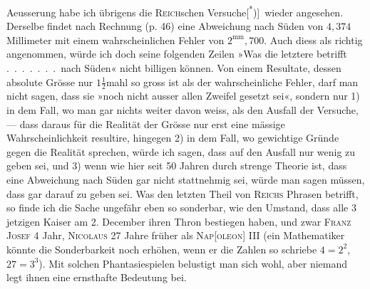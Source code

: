 \clearpage{}
\noindent Aeusserung habe ich übrigens die \textsc{Reich}schen Versuche[\textsuperscript{*})]\begingroup\renewcommand{\thefootnote}{}\endgroup\ wieder angesehen.
Derselbe findet nach  Rechnung (p. 46) eine Abweichung nach Süden
von \(4{,}374\) Millimeter mit einem wahrscheinlichen Fehler von \(2^{\mathrm{mm}}{,}700\). Auch
diess als richtig angenommen, würde ich doch seine folgenden Zeilen »Was
die letztere betrifft .\ .\ .\ .\ .\ .\ .\ nach Süden« nicht billigen können. Von einem
Resultate, dessen absolute Grösse nur \(1\tfrac{1}{2}\)mahl so gross ist als der wahrscheinliche
Fehler, darf man nicht sagen, dass sie »noch nicht ausser allen Zweifel
gesetzt sei«, sondern nur 1) in dem Fall, wo man gar nichts weiter davon
weiss, als den Ausfall der Versuche, — dass daraus für die Realität der Grösse
nur erst eine mässige Wahrscheinlichkeit resultire, hingegen 2) in dem Fall,
wo  gewichtige Gründe gegen die Realität sprechen, würde ich sagen,
dass auf den Ausfall nur wenig zu geben sei, und 3) wenn wie hier seit 50
Jahren durch strenge Theorie  ist, dass eine Abweichung nach Süden
gar nicht stattnehmig sei, würde man sagen müssen, dass gar  darauf
zu geben sei. Was den letzten Theil von \textsc{Reichs} Phrasen betrifft, so finde
ich die Sache ungefähr eben so sonderbar, wie den Umstand, dass alle 3 jetzigen
Kaiser am 2. December ihren Thron bestiegen haben, und zwar \textsc{Franz Josef}
4 Jahr, \textsc{Nicolaus} 27 Jahre früher als \textsc{Nap[oleon]} III (ein Mathematiker könnte
die Sonderbarkeit noch erhöhen, wenn er die Zahlen so schriebe \(4=2^2\),
\(27=3^3\)). Mit solchen Phantasiespielen belustigt man sich wohl, aber niemand
legt ihnen eine ernsthafte Bedeutung bei.

